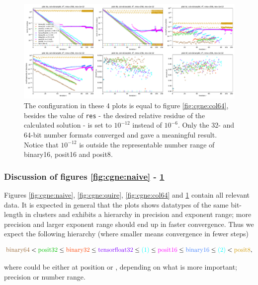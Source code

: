 \documentclass{article}
\theoremstyle{plain} %
\theoremstyle{remark} %
\def\code#1{\texttt{#1}}
\numberwithin{equation}{section}
\begin{document}
\begin{figure}
    \centering
    \includegraphics[width=1.0\textwidth]{plots/cgne_new3}
    \caption{The configuration in these 4 plots is equal to figure \ref{fig:cgne:col64}, besides the value of \code{res} - the desired relative residue of the calculated solution - is set to $10^{-12}$ instead of $10^{-6}$. Only the 32- and 64-bit number formats converged and gave a meaningful result. Notice that $10^{-12}$ is outside the representable number range of \gls{binary16}, \gls{posit16} and \gls{posit8}.}
    \label{fig:cgne:res12}
\end{figure}

\subsubsection{Discussion of figures \ref{fig:cgne:naive} - \ref{fig:cgne:res12}}

Figures \ref{fig:cgne:naive}, \ref{fig:cgne:quire}, \ref{fig:cgne:col64} and \ref{fig:cgne:res12} contain all relevant data. It is expected in general that the plots shows datatypes of the same bit-length in clusters and exhibits a hierarchy in precision and exponent range; more precision and larger exponent range should end up in faster convergence. Thus we expect the following hierarchy (where smaller means convergence in fewer steps)

\begin{align}
    \textcolor{cbrown}{\text{binary64}} < \textcolor{cgreen}{\text{posit32}} \leq \textcolor{cred}{\text{binary32}} \leq \textcolor{cpurple}{\text{tensorfloat32}} \leq \textcolor{cturquois}{\text{(1)}} \leq \textcolor{cpink}{\text{posit16}} \leq \textcolor{cblue}{\text{binary16}} \leq \textcolor{cturquois}{\text{(2)}} < \textcolor{cyellow}{\text{posit8}}, \label{eq:hierarchy}
\end{align}

where \textcolor{cturquois}{} could be either at position \textcolor{cturquois}{} or \textcolor{cturquois}{}, depending on what is more important; precision or number range.
\end{document}
